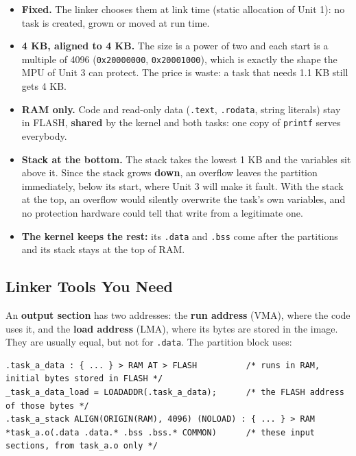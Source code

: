 \begin{itemize}
    \item \textbf{Fixed.} The linker chooses them at link time (static allocation of Unit 1): no task is created, grown or moved at run time.
    \item \textbf{4 KB, aligned to 4 KB.} The size is a power of two and each start is a multiple of 4096 (\texttt{0x20000000}, \texttt{0x20001000}), which is exactly the shape the MPU of Unit 3 can protect. The price is waste: a task that needs 1.1 KB still gets 4 KB.
    \item \textbf{RAM only.} Code and read-only data (\texttt{.text}, \texttt{.rodata}, string literals) stay in FLASH, \textbf{shared} by the kernel and both tasks: one copy of \texttt{printf} serves everybody.
    \item \textbf{Stack at the bottom.} The stack takes the lowest 1 KB and the variables sit above it. Since the stack grows \textbf{down}, an overflow leaves the partition immediately, below its start, where Unit 3 will make it fault. With the stack at the top, an overflow would silently overwrite the task's own variables, and no protection hardware could tell that write from a legitimate one.
    \item \textbf{The kernel keeps the rest:} its \texttt{.data} and \texttt{.bss} come after the partitions and its stack stays at the top of RAM.
\end{itemize}

\subsection{Linker Tools You Need}

An \textbf{output section} has two addresses: the \textbf{run address} (VMA), where the code uses it, and the \textbf{load address} (LMA), where its bytes are stored in the image. They are usually equal, but not for \texttt{.data}. The partition block uses:

\begin{lstlisting}
.task_a_data : { ... } > RAM AT > FLASH          /* runs in RAM, initial bytes stored in FLASH */
_task_a_data_load = LOADADDR(.task_a_data);      /* the FLASH address of those bytes */
.task_a_stack ALIGN(ORIGIN(RAM), 4096) (NOLOAD) : { ... } > RAM
*task_a.o(.data .data.* .bss .bss.* COMMON)      /* these input sections, from task_a.o only */
\end{lstlisting}

